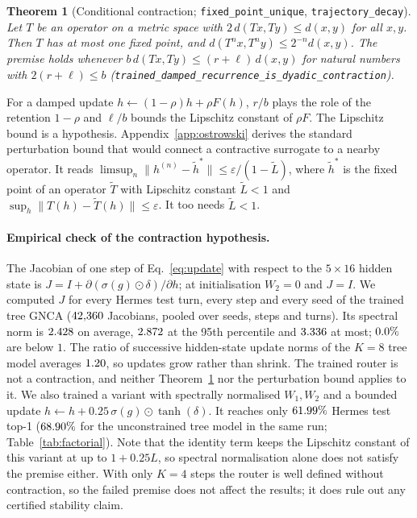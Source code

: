 \documentclass[10pt]{article}
\newtheorem{theorem}{Theorem}
\begin{document}
\begin{theorem}[Conditional contraction; \texttt{fixed\_\allowbreak{}point\_\allowbreak{}unique}, \texttt{trajectory\_\allowbreak{}decay}]\label{thm:contraction}
Let $T$ be an operator on a metric space with $2\,d(T x, T y) \le d(x,y)$ for all $x,y$. Then $T$ has at most one fixed point, and $d(T^n x, T^n y) \le 2^{-n} d(x,y)$. The premise holds whenever $b\,d(Tx,Ty)\le(r+\ell)\,d(x,y)$ for natural numbers with $2(r+\ell)\le b$ (\texttt{trained\_\allowbreak{}damped\_\allowbreak{}recurrence\_\allowbreak{}is\_\allowbreak{}dyadic\_\allowbreak{}contraction}).
\end{theorem}
For a damped update $h\leftarrow(1-\rho)h+\rho F(h)$, $r/b$ plays the role of the retention $1-\rho$ and $\ell/b$ bounds the Lipschitz constant of $\rho F$. The Lipschitz bound is a hypothesis. Appendix~\ref{app:ostrowski} derives the standard perturbation bound that would connect a contractive surrogate to a nearby operator. It reads $\limsup_n\|h^{(n)}-\tilde h^\ast\| \le \varepsilon/(1-\tilde L)$, where $\tilde h^\ast$ is the fixed point of an operator $\tilde T$ with Lipschitz constant $\tilde L<1$ and $\sup_h\|T(h)-\tilde T(h)\|\le\varepsilon$. It too needs $\tilde L<1$.

\paragraph{Empirical check of the contraction hypothesis.} The Jacobian of one step of Eq.~\eqref{eq:update} with respect to the $5\times16$ hidden state is $J = I + \partial(\sigma(g)\odot\delta)/\partial h$; at initialisation $W_2=0$ and $J=I$. We computed $J$ for every Hermes test turn, every step and every seed of the trained tree GNCA ($42{,}360$ Jacobians, pooled over seeds, steps and turns). Its spectral norm is $2.428$ on average, $2.872$ at the 95th percentile and $3.336$ at most; $0.0\%$ are below $1$. The ratio of successive hidden-state update norms of the $K{=}8$ tree model averages $1.20$, so updates grow rather than shrink. The trained router is not a contraction, and neither Theorem~\ref{thm:contraction} nor the perturbation bound applies to it. We also trained a variant with spectrally normalised $W_1,W_2$ and a bounded update $h \leftarrow h + 0.25\,\sigma(g)\odot\tanh(\delta)$. It reaches only $61.99\%$ Hermes test top-1 ($68.90\%$ for the unconstrained tree model in the same run; Table~\ref{tab:factorial}). Note that the identity term keeps the Lipschitz constant of this variant at up to $1+0.25L$, so spectral normalisation alone does not satisfy the premise either. With only $K{=}4$ steps the router is well defined without contraction, so the failed premise does not affect the results; it does rule out any certified stability claim.
\end{document}
